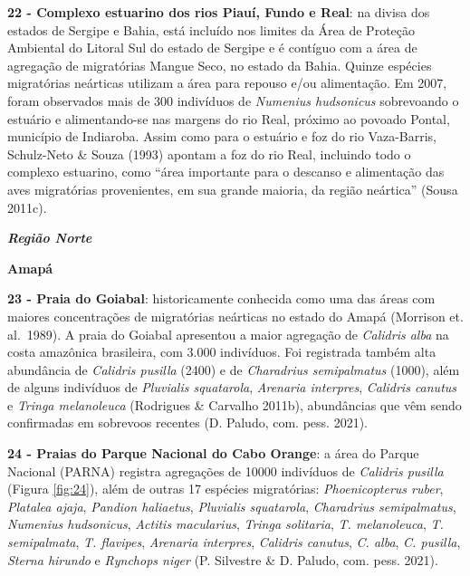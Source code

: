 \documentclass[
  oneside]{scrbook}
\begin{document}
\textbf{22 - Complexo estuarino dos rios Piauí, Fundo e Real}: na divisa dos estados de Sergipe e Bahia, está incluído nos limites da Área de Proteção Ambiental do Litoral Sul do estado de Sergipe e é contíguo com a área de agregação de migratórias Mangue Seco, no estado da Bahia. Quinze espécies migratórias neárticas utilizam a área para repouso e/ou alimentação. Em 2007, foram observados mais de 300 indivíduos de \emph{Numenius hudsonicus} sobrevoando o estuário e alimentando-se nas margens do rio Real, próximo ao povoado Pontal, município de Indiaroba. Assim como para o estuário e foz do rio Vaza-Barris, Schulz-Neto \& Souza (1993) apontam a foz do rio Real, incluindo todo o complexo estuarino, como ``área importante para o descanso e alimentação das aves migratórias provenientes, em sua grande maioria, da região neártica'' (Sousa 2011c).

\textbf{\emph{Região Norte}}

\textbf{Amapá}

\textbf{23 - Praia do Goiabal}: historicamente conhecida como uma das áreas com maiores concentrações de migratórias neárticas no estado do Amapá (Morrison et. al.~1989). A praia do Goiabal apresentou a maior agregação de \emph{Calidris alba} na costa amazônica brasileira, com 3.000 indivíduos. Foi registrada também alta abundância de \emph{Calidris pusilla} (2400) e de \emph{Charadrius semipalmatus} (1000), além de alguns indivíduos de \emph{Pluvialis squatarola}, \emph{Arenaria interpres}, \emph{Calidris canutus} e \emph{Tringa melanoleuca} (Rodrigues \& Carvalho 2011b), abundâncias que vêm sendo confirmadas em sobrevoos recentes (D. Paludo, com. pess. 2021).

\textbf{24 - Praias do Parque Nacional do Cabo Orange}: a área do Parque Nacional (PARNA) registra agregações de 10000 indivíduos de \emph{Calidris pusilla} (Figura \ref{fig:24}), além de outras 17 espécies migratórias: \emph{Phoenicopterus ruber}, \emph{Platalea ajaja}, \emph{Pandion haliaetus}, \emph{Pluvialis squatarola}, \emph{Charadrius semipalmatus}, \emph{Numenius hudsonicus}, \emph{Actitis macularius}, \emph{Tringa solitaria}, \emph{T. melanoleuca}, \emph{T. semipalmata}, \emph{T. flavipes}, \emph{Arenaria interpres}, \emph{Calidris canutus}, \emph{C. alba}, \emph{C. pusilla}, \emph{Sterna hirundo} e \emph{Rynchops niger} (P. Silvestre \& D. Paludo, com. pess. 2021).
\end{document}

